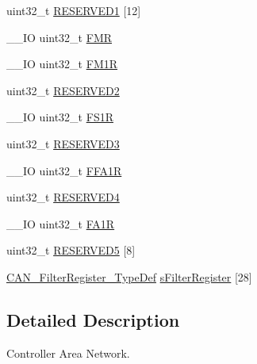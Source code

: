 \begin{DoxyCompactItemize}
\item 
uint32\-\_\-t \hyperlink{struct_c_a_n___type_def_a4bb07a7828fbd5fe86f6a5a3545c177d}{R\-E\-S\-E\-R\-V\-E\-D1} \mbox{[}12\mbox{]}
\item 
\-\_\-\-\_\-\-I\-O uint32\-\_\-t \hyperlink{struct_c_a_n___type_def_a1cb734df34f6520a7204c4c70634ebba}{F\-M\-R}
\item 
\-\_\-\-\_\-\-I\-O uint32\-\_\-t \hyperlink{struct_c_a_n___type_def_aaa6f4cf1f16aaa6d17ec6c410db76acf}{F\-M1\-R}
\item 
uint32\-\_\-t \hyperlink{struct_c_a_n___type_def_a4c9b972a304c0e08ca27cbe57627c496}{R\-E\-S\-E\-R\-V\-E\-D2}
\item 
\-\_\-\-\_\-\-I\-O uint32\-\_\-t \hyperlink{struct_c_a_n___type_def_aae0256ae42106ee7f87fc7e5bdb779d4}{F\-S1\-R}
\item 
uint32\-\_\-t \hyperlink{struct_c_a_n___type_def_af2b40c5e36a5e861490988275499e158}{R\-E\-S\-E\-R\-V\-E\-D3}
\item 
\-\_\-\-\_\-\-I\-O uint32\-\_\-t \hyperlink{struct_c_a_n___type_def_af1405e594e39e5b34f9499f680157a25}{F\-F\-A1\-R}
\item 
uint32\-\_\-t \hyperlink{struct_c_a_n___type_def_ac0018930ee9f18afda25b695b9a4ec16}{R\-E\-S\-E\-R\-V\-E\-D4}
\item 
\-\_\-\-\_\-\-I\-O uint32\-\_\-t \hyperlink{struct_c_a_n___type_def_aaf76271f4ab0b3deb3ceb6e2ac0d62d0}{F\-A1\-R}
\item 
uint32\-\_\-t \hyperlink{struct_c_a_n___type_def_a269f31b91d0f38a48061b76ecc346f55}{R\-E\-S\-E\-R\-V\-E\-D5} \mbox{[}8\mbox{]}
\item 
\hyperlink{struct_c_a_n___filter_register___type_def}{C\-A\-N\-\_\-\-Filter\-Register\-\_\-\-Type\-Def} \hyperlink{struct_c_a_n___type_def_a31bd74513e6e599319702ad34113bf59}{s\-Filter\-Register} \mbox{[}28\mbox{]}
\end{DoxyCompactItemize}


\subsection{Detailed Description}
Controller Area Network. 

